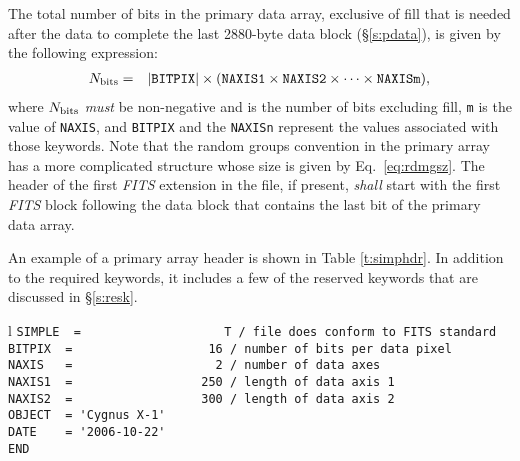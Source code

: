 \documentclass[11pt,makeidx]{book}     %
\begin{document}
 The total number of bits in the primary data array, 
 exclusive of fill that is needed after the data to complete the last 2880-byte data block 
 (\S\ref{s:pdata}), is given by the
 following expression:
\begin{eqnarray}  
   \mbox{$N_{\rm bits}$} &=&  
                     |\mbox{{\tt BITPIX}}|  \times 
                     (\mbox{{\tt NAXIS1}} \times 
                     \mbox{{\tt NAXIS2}} \times  \cdots \times 
                     \mbox{{\tt NAXISm}}),              \label{eq:prnbit}
\end{eqnarray}
 \noindent
 where $N_{\rm bits}$ {\em must} be
 non-negative and is the number of bits excluding fill, 
 {\tt m} is the value of {\tt NAXIS}, and
 {\tt BITPIX} and the {\tt NAXISn} represent 
 the values associated with those keywords.          
Note that the random groups convention in the primary array has a more
complicated structure whose size is given by Eq.\ \ref{eq:rdmgsz}.
The header of the first {\em FITS\/} extension 
in the file, if present, {\em shall} start with the first {\em FITS\/} block following 
the data block that contains the last bit of the primary data array.

An example of a primary array header is shown in Table \ref{t:simphdr}.  In addition
to the required keywords, it includes a few of the reserved keywords 
that are discussed in \S\ref{s:resk}.

\begin{deluxetable}{l}
\tabletypesize{\normalsize}
\tablewidth{0pt}
%
\startdata
{\verb+SIMPLE  =                    T / file does conform to FITS standard+} \\
{\verb+BITPIX  =                   16 / number of bits per data pixel+} \\
{\verb+NAXIS   =                    2 / number of data axes+} \\
{\verb+NAXIS1  =                  250 / length of data axis 1+} \\
{\verb+NAXIS2  =                  300 / length of data axis 2+} \\
{\verb+OBJECT  = 'Cygnus X-1'+} \\
{\verb+DATE    = '2006-10-22'+} \\
{\verb+END+} \\
\enddata
\end{deluxetable}
\end{document}
